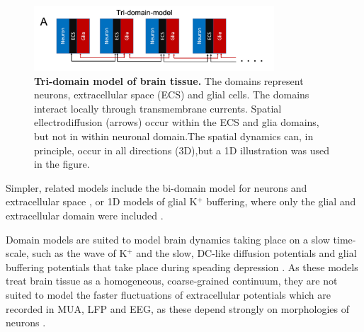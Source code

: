 \begin{figure}[!ht]
\begin{center}
\includegraphics[width=0.8\textwidth]{Figures/Schemes/Tridomain.png}
\end{center}
\caption{\textbf{Tri-domain model of brain tissue.} The domains represent neurons, extracellular space (ECS) and glial cells. The domains interact locally through transmembrane currents. Spatial ellectrodiffusion (arrows) occur within the ECS and glia domains, but not in within neuronal domain.The spatial dynamics can, in principle, occur in all directions (3D),but a 1D illustration was used in the figure. 
}
\label{Schemes:fig:domainmodel}
\end{figure}

Simpler, related models include the bi-domain model for neurons and extracellular space \citep{Mori2015}, or 1D models of glial K$^+$ buffering, where only the glial and extracellular domain were included \cite{Gardner-Medwin1983, Chen2000, Halnes2013}.

Domain models are suited to model brain dynamics taking place on a slow time-scale, such as the wave of K$^+$ and the slow, DC-like diffusion potentials and glial buffering potentials that take place during speading depression \citep{Mori2015, OConnell2016, tuttle2019}. As these models treat brain tissue as a homogeneous, coarse-grained continuum, they are not suited to model the faster fluctuations of extracellular potentials which are recorded in MUA, LFP and EEG, as these depend strongly on morphologies of neurons \citep{Einevoll2013}. 








